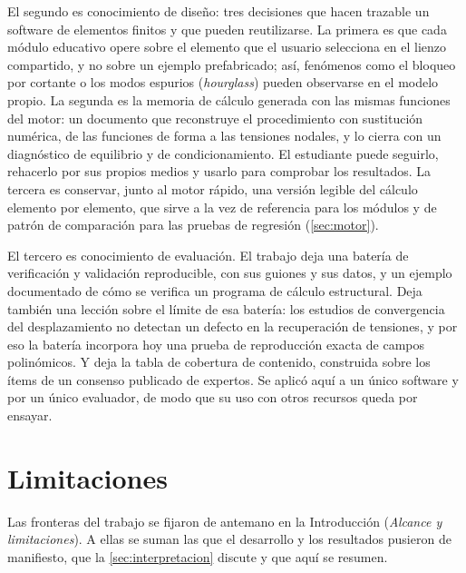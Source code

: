 El segundo es conocimiento de diseño: tres decisiones que hacen trazable un software de elementos finitos y que pueden reutilizarse. La primera es que cada módulo educativo opere sobre el elemento que el usuario selecciona en el lienzo compartido, y no sobre un ejemplo prefabricado; así, fenómenos como el bloqueo por cortante o los modos espurios (\emph{hourglass}) pueden observarse en el modelo propio. La segunda es la memoria de cálculo generada con las mismas funciones del motor: un documento que reconstruye el procedimiento con sustitución numérica, de las funciones de forma a las tensiones nodales, y lo cierra con un diagnóstico de equilibrio y de condicionamiento. El estudiante puede seguirlo, rehacerlo por sus propios medios y usarlo para comprobar los resultados. La tercera es conservar, junto al motor rápido, una versión legible del cálculo elemento por elemento, que sirve a la vez de referencia para los módulos y de patrón de comparación para las pruebas de regresión (\autoref{sec:motor}).

El tercero es conocimiento de evaluación. El trabajo deja una batería de verificación y validación reproducible, con sus guiones y sus datos, y un ejemplo documentado de cómo se verifica un programa de cálculo estructural. Deja también una lección sobre el límite de esa batería: los estudios de convergencia del desplazamiento no detectan un defecto en la recuperación de tensiones, y por eso la batería incorpora hoy una prueba de reproducción exacta de campos polinómicos. Y deja la tabla de cobertura de contenido, construida sobre los ítems de un consenso publicado de expertos. Se aplicó aquí a un único software y por un único evaluador, de modo que su uso con otros recursos queda por ensayar.

\section*{Limitaciones}

Las fronteras del trabajo se fijaron de antemano en la Introducción (\emph{Alcance y limitaciones}). A ellas se suman las que el desarrollo y los resultados pusieron de manifiesto, que la \autoref{sec:interpretacion} discute y que aquí se resumen.


